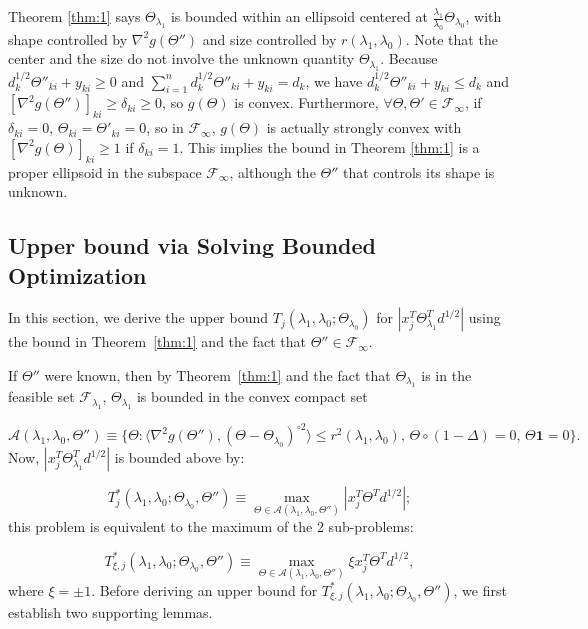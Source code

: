 Theorem \ref{thm:1} says $\Theta_{\lambda_1}$ is bounded within an ellipsoid centered at $\frac{\lambda_1}{\lambda_0}\Theta_{\lambda_0}$, with shape controlled by $\nabla^2g(\Theta'')$ and size controlled by $r(\lambda_1,\lambda_0)$. Note that the center and the size do not involve the unknown quantity $\Theta_{\lambda_1}$. Because $d_k^{1/2}\Theta''_{ki}+y_{ki}\geq 0$ and $\sum_{i=1}^nd_k^{1/2}\Theta''_{ki}+y_{ki}=d_k$, we have $d_k^{1/2}\Theta''_{ki}+y_{ki}\leq d_k$ and $[\nabla^2 g(\Theta'')]_{ki}\geq\delta_{ki}\geq 0$, so $g(\Theta)$ is convex. Furthermore, $\forall\Theta,\Theta'\in\mathcal{F}_{\infty}$, if $\delta_{ki}=0$, $\Theta_{ki}=\Theta'_{ki}=0$, so in $\mathcal{F}_{\infty}$, $g(\Theta)$ is actually strongly convex with $[\nabla^2 g(\Theta)]_{ki}\geq 1$ if $\delta_{ki}=1$. This implies the bound in Theorem \ref{thm:1} is a proper ellipsoid in the subspace $\mathcal{F}_{\infty}$, although the $\Theta''$ that controls its shape is unknown.

\subsection{Upper bound via Solving Bounded Optimization}

In this section, we derive the upper bound $T_j(\lambda_1,\lambda_0;\Theta_{\lambda_0})$ for $|x_j^T\Theta^T_{\lambda_1}d^{1/2}|$ using the bound in Theorem~\ref{thm:1} and the fact that $\Theta''\in\mathcal{F}_{\infty}$.

If $\Theta''$ were known, then by Theorem~\ref{thm:1} and the fact that $\Theta_{\lambda_1}$ is in the feasible set $\mathcal{F}_{\lambda_1}$, $\Theta_{\lambda_1}$ is bounded in the convex compact set

 \begin{equation}
     \mathcal{A}(\lambda_1,{\lambda_0},\Theta'')\equiv\{\Theta:\langle\nabla^2 g(\Theta''),(\Theta-\Theta_{\lambda_0})^{\circ 2}\rangle\leq r^2(\lambda_1,\lambda_0),\,\Theta\circ(1-\Delta)=0,\, \Theta\mathbf{1}=0\}.
 \end{equation}
Now, $|x_j^T\Theta^T_{\lambda_1}d^{1/2}|$ is bounded above by:

\begin{equation}
    T^*_{j}(\lambda_1,\lambda_0;\Theta_{\lambda_0},\Theta'')\equiv\max_{\Theta\in\mathcal{A}(\lambda_1,{\lambda_0},\Theta'')} |x_j^T\Theta^T d^{1/2}|;
\end{equation}
this problem is equivalent to the maximum of the 2 sub-problems:

\begin{equation}
    \label{eq:bounddual}
    T^*_{\xi,j}(\lambda_1,\lambda_0;\Theta_{\lambda_0},\Theta'')\equiv\max_{\Theta\in\mathcal{A}(\lambda_1,{\lambda_0},\Theta'')} \xi x_j^T\Theta^T d^{1/2},
\end{equation}
where $\xi = \pm 1$. Before deriving an upper bound for $T^*_{\xi,j}(\lambda_1,\lambda_0;\Theta_{\lambda_0},\Theta'')$, we first establish two supporting lemmas.

